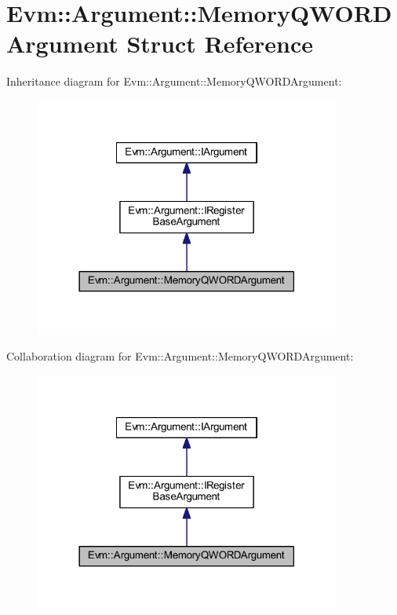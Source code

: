 \hypertarget{struct_evm_1_1_argument_1_1_memory_q_w_o_r_d_argument}{}\section{Evm\+:\+:Argument\+:\+:Memory\+Q\+W\+O\+R\+D\+Argument Struct Reference}
\label{struct_evm_1_1_argument_1_1_memory_q_w_o_r_d_argument}


Inheritance diagram for Evm\+:\+:Argument\+:\+:Memory\+Q\+W\+O\+R\+D\+Argument\+:
\nopagebreak
\begin{figure}[H]
\begin{center}
\leavevmode
\includegraphics[width=285pt]{struct_evm_1_1_argument_1_1_memory_q_w_o_r_d_argument__inherit__graph}
\end{center}
\end{figure}


Collaboration diagram for Evm\+:\+:Argument\+:\+:Memory\+Q\+W\+O\+R\+D\+Argument\+:
\nopagebreak
\begin{figure}[H]
\begin{center}
\leavevmode
\includegraphics[width=285pt]{struct_evm_1_1_argument_1_1_memory_q_w_o_r_d_argument__coll__graph}
\end{center}
\end{figure}

